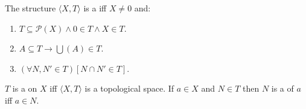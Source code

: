 The structure $\langle X, T \rangle$ is a  iff $X \neq 0$ and:
\begin{enumerate}
\item $T \subseteq \mathcal{P}(X) \land 0 \in T \land X \in T$.
\item $A \subseteq T \rightarrow \bigcup (A) \in T$.
\item $(\forall N, N' \in T)[N \cap N' \in T]$.
\end{enumerate}
$T$ is a  on $X$ iff $\langle X, T \rangle$ is a topological space. If $a \in X$ and $N \in T$ then $N$ is a  of $a$ iff $a \in N$.
